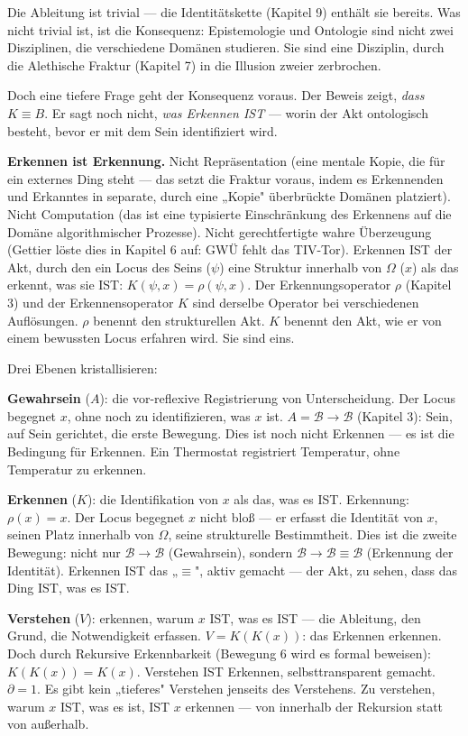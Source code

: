 \documentclass[10pt, openany, oneside]{book}
\begin{document}
\noindent Die Ableitung ist trivial --- die Identitätskette (Kapitel 9) enthält sie bereits. Was nicht trivial ist, ist die Konsequenz: Epistemologie und Ontologie sind nicht zwei Disziplinen, die verschiedene Domänen studieren. Sie sind eine Disziplin, durch die Alethische Fraktur (Kapitel 7) in die Illusion zweier zerbrochen.

Doch eine tiefere Frage geht der Konsequenz voraus. Der Beweis zeigt, \textit{dass} $K \equiv B$. Er sagt noch nicht, \textit{was Erkennen IST} --- worin der Akt ontologisch besteht, bevor er mit dem Sein identifiziert wird.

\textbf{Erkennen ist Erkennung.} Nicht Repräsentation (eine mentale Kopie, die für ein externes Ding steht --- das setzt die Fraktur voraus, indem es Erkennenden und Erkanntes in separate, durch eine „Kopie" überbrückte Domänen platziert). Nicht Computation (das ist eine typisierte Einschränkung des Erkennens auf die Domäne algorithmischer Prozesse). Nicht gerechtfertigte wahre Überzeugung (Gettier löste dies in Kapitel 6 auf: GWÜ fehlt das TIV-Tor). Erkennen IST der Akt, durch den ein Locus des Seins ($\psi$) eine Struktur innerhalb von $\Omega$ ($x$) als das erkennt, was sie IST: $K(\psi, x) = \rho(\psi, x)$. Der Erkennungsoperator $\rho$ (Kapitel 3) und der Erkennensoperator $K$ sind derselbe Operator bei verschiedenen Auflösungen. $\rho$ benennt den strukturellen Akt. $K$ benennt den Akt, wie er von einem bewussten Locus erfahren wird. Sie sind eins.

Drei Ebenen kristallisieren:

\textbf{Gewahrsein} ($A$): die vor-reflexive Registrierung von Unterscheidung. Der Locus begegnet $x$, ohne noch zu identifizieren, was $x$ ist. $A = \mathcal{B} \to \mathcal{B}$ (Kapitel 3): Sein, auf Sein gerichtet, die erste Bewegung. Dies ist noch nicht Erkennen --- es ist die Bedingung für Erkennen. Ein Thermostat registriert Temperatur, ohne Temperatur zu erkennen.

\textbf{Erkennen} ($K$): die Identifikation von $x$ als das, was es IST. Erkennung: $\rho(x) = x$. Der Locus begegnet $x$ nicht bloß --- er erfasst die Identität von $x$, seinen Platz innerhalb von $\Omega$, seine strukturelle Bestimmtheit. Dies ist die zweite Bewegung: nicht nur $\mathcal{B} \to \mathcal{B}$ (Gewahrsein), sondern $\mathcal{B} \to \mathcal{B} \equiv \mathcal{B}$ (Erkennung der Identität). Erkennen IST das „$\equiv$", aktiv gemacht --- der Akt, zu sehen, dass das Ding IST, was es IST.

\textbf{Verstehen} ($V$): erkennen, warum $x$ IST, was es IST --- die Ableitung, den Grund, die Notwendigkeit erfassen. $V = K(K(x))$: das Erkennen erkennen. Doch durch Rekursive Erkennbarkeit (Bewegung 6 wird es formal beweisen): $K(K(x)) = K(x)$. Verstehen IST Erkennen, selbsttransparent gemacht. $\partial = 1$. Es gibt kein „tieferes" Verstehen jenseits des Verstehens. Zu verstehen, warum $x$ IST, was es ist, IST $x$ erkennen --- von innerhalb der Rekursion statt von außerhalb.
\end{document}
